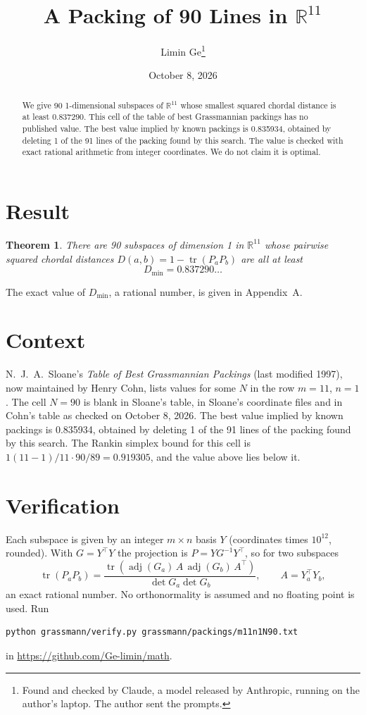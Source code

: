 \documentclass[11pt,a4paper]{article}
\title{A Packing of 90 Lines in $\mathbb{R}^{11}$}
\author{Limin Ge\thanks{Found and checked by Claude, a model released by Anthropic, running on the author's laptop. The author sent the prompts.}}
\date{October 8, 2026}
\newtheorem*{theorem}{Theorem}
\begin{document}
\maketitle
\begin{abstract}
We give 90 1-dimensional subspaces of $\mathbb{R}^{11}$ whose smallest squared chordal distance is at least 0.837290. This cell of the table of best Grassmannian packings has no published value. The best value implied by known packings is 0.835934, obtained by deleting 1 of the 91 lines of the packing found by this search. The value is checked with exact rational arithmetic from integer coordinates. We do not claim it is optimal.
\end{abstract}

\section{Result}
\begin{theorem}
There are 90 subspaces of dimension 1 in $\mathbb{R}^{11}$ whose pairwise squared chordal distances $D(a,b) = 1 - \operatorname{tr}(P_aP_b)$ are all at least
\[ D_{\min} = 0.837290\ldots \]
\end{theorem}
The exact value of $D_{\min}$, a rational number, is given in Appendix~A.


\section{Context}
N.~J.~A.~Sloane's \emph{Table of Best Grassmannian Packings} (last modified 1997), now maintained by Henry Cohn, lists values for some $N$ in the row $m=11$, $n=1$. The cell $N=90$ is blank in Sloane's table, in Sloane's coordinate files and in Cohn's table as checked on October 8, 2026. The best value implied by known packings is 0.835934, obtained by deleting 1 of the 91 lines of the packing found by this search. The Rankin simplex bound for this cell is $1(11-1)/11\cdot 90/89 = 0.919305$, and the value above lies below it.


\section{Verification}
Each subspace is given by an integer $m\times n$ basis $Y$ (coordinates times $10^{12}$, rounded). With $G=Y^\top Y$ the projection is $P=YG^{-1}Y^\top$, so for two subspaces
\[ \operatorname{tr}(P_aP_b)=\frac{\operatorname{tr}(\operatorname{adj}(G_a)\,A\,\operatorname{adj}(G_b)\,A^\top)}{\det G_a\det G_b},\qquad A=Y_a^\top Y_b, \]
an exact rational number. No orthonormality is assumed and no floating point is used. Run
\begin{verbatim}
python grassmann/verify.py grassmann/packings/m11n1N90.txt
\end{verbatim}
in \url{https://github.com/Ge-limin/math}.
\end{document}
